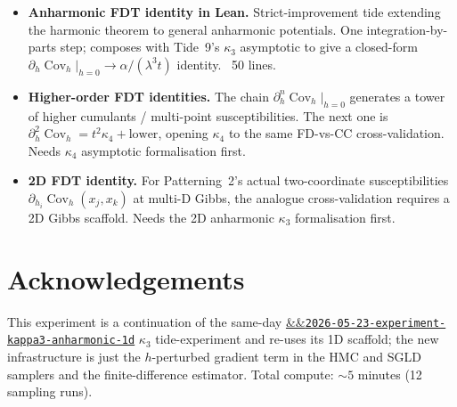 \documentclass[11pt]{article}
\newcommand{\experimentref}[2][]{\href{https://therisensea.org/experiments/#2/}{\ifx&#1&\texttt{#2}\else#1\fi}}
\newcommand{\Cov}{\operatorname{Cov}}
\begin{document}
\begin{itemize}[noitemsep,leftmargin=*]
\item \textbf{Anharmonic FDT identity in Lean.} Strict-improvement
  tide extending the harmonic theorem to general anharmonic
  potentials. One integration-by-parts step;
  composes with Tide~9's $\kappa_3$ asymptotic to give a closed-form
  $\partial_h \Cov_h|_{h=0} \to \alpha / (\lambda^3 t)$ identity. ~50
  lines.

\item \textbf{Higher-order FDT identities.} The chain
  $\partial_h^n \Cov_h |_{h=0}$ generates a tower of higher cumulants
  / multi-point susceptibilities. The next one is $\partial_h^2
  \Cov_h = t^2 \kappa_4 + \text{lower}$, opening $\kappa_4$ to the
  same FD-vs-CC cross-validation. Needs $\kappa_4$ asymptotic
  formalisation first.

\item \textbf{2D FDT identity.} For Patterning~2's actual two-coordinate
  susceptibilities $\partial_{h_i} \Cov_h(x_j, x_k)$ at multi-D
  Gibbs, the analogue cross-validation requires a 2D Gibbs scaffold.
  Needs the 2D anharmonic $\kappa_3$ formalisation first.
\end{itemize}

\section*{Acknowledgements}

This experiment is a continuation of the same-day
\experimentref{2026-05-23-experiment-kappa3-anharmonic-1d}
$\kappa_3$ tide-experiment and re-uses its 1D scaffold; the new
infrastructure is just the $h$-perturbed gradient term in the
HMC and SGLD samplers and the finite-difference estimator. Total
compute: $\sim 5$ minutes (12 sampling runs).
\end{document}
